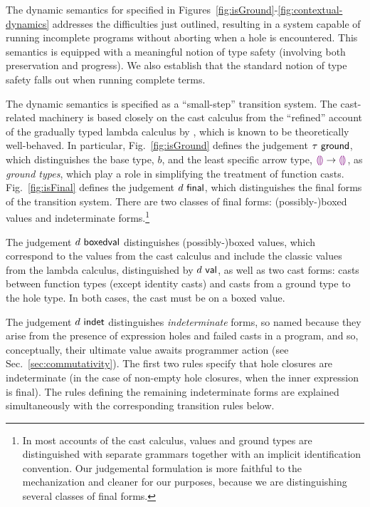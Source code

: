 The dynamic semantics for \HazelnutLive specified in Figures~\ref{fig:isGround}-\ref{fig:contextual-dynamics} addresses the difficulties just outlined, resulting in a system capable of running incomplete programs without aborting when a hole is encountered. This semantics is equipped with a meaningful notion of type safety (involving both preservation and progress). We also establish that the standard notion of type safety falls out when running complete terms. %

The dynamic semantics is specified as a ``small-step'' transition system. The cast-related machinery is based closely on the cast calculus from the ``refined'' account of the gradually typed lambda calculus by \citet{DBLP:conf/snapl/SiekVCB15}, which is known to be theoretically well-behaved. In particular, Fig.~\ref{fig:isGround} defines the judgement $\tau~\mathsf{ground}$, which distinguishes the base type, $b$, and the least specific arrow type, $\textcolor{violet}{\llparenthesis}\textcolor{violet}{\rrparenthesis} \rightarrow \textcolor{violet}{\llparenthesis}\textcolor{violet}{\rrparenthesis}$, as \emph{ground types}, which play a role in simplifying the treatment of function casts. Fig.~\ref{fig:isFinal} defines the judgement $d~\mathsf{final}$, which distinguishes the final forms of the transition system. There are two classes of final forms: (possibly-)boxed values and indeterminate forms.\footnote{In most accounts of the cast calculus, values and ground types are distinguished with separate grammars together with an implicit identification convention. Our judgemental formulation is more faithful to the mechanization and cleaner for our purposes, because we are distinguishing several classes of final forms.}




The judgement $d~\mathsf{boxedval}$ distinguishes (possibly-)boxed values, which correspond to the values from the cast calculus and include the classic values from the lambda calculus, distinguished by $d~\mathsf{val}$, as well as two cast forms: casts between function types (except identity casts) and casts from a ground type to the hole type. In both cases, the cast must be on a boxed value. %

The judgement $d~\mathsf{indet}$ distinguishes \emph{indeterminate} forms, so named because they arise from the presence of expression holes and failed casts in a program, and so, conceptually, their ultimate value awaits programmer action (see Sec.~\ref{sec:commutativity}). The first two rules specify that hole closures are indeterminate (in the case of non-empty hole closures, when the inner expression is final). The rules defining the remaining indeterminate forms are explained simultaneously with the corresponding transition rules below.

